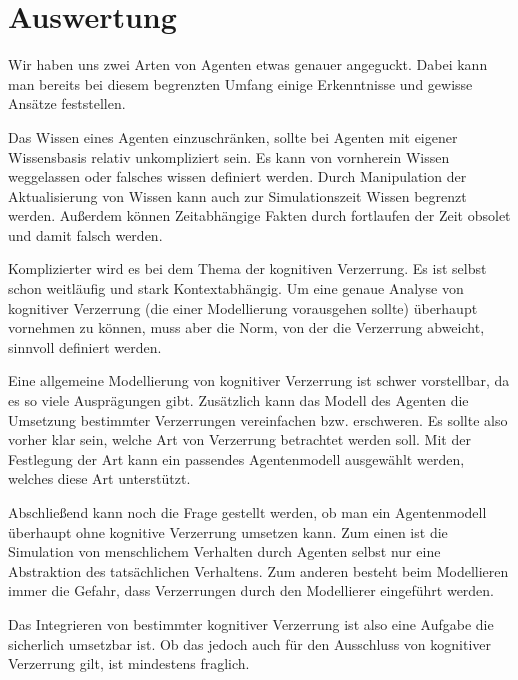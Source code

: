 \chapter{Auswertung}
Wir haben uns zwei Arten von Agenten etwas genauer angeguckt.
Dabei kann man bereits bei diesem begrenzten Umfang einige Erkenntnisse und gewisse Ansätze feststellen.

Das Wissen eines Agenten einzuschränken, sollte bei Agenten mit eigener Wissensbasis relativ unkompliziert sein. 
Es kann von vornherein Wissen weggelassen oder falsches wissen definiert werden.
Durch Manipulation der Aktualisierung von Wissen kann auch zur Simulationszeit Wissen begrenzt werden.
Außerdem können Zeitabhängige Fakten durch fortlaufen der Zeit obsolet und damit falsch werden.

Komplizierter wird es bei dem Thema der kognitiven Verzerrung.
Es ist selbst schon weitläufig und stark Kontextabhängig.
Um eine genaue Analyse von kognitiver Verzerrung (die einer Modellierung vorausgehen sollte) überhaupt vornehmen zu können, muss aber die Norm, von der die Verzerrung abweicht, sinnvoll definiert werden.

Eine allgemeine Modellierung von kognitiver Verzerrung ist schwer vorstellbar, da es so viele Ausprägungen gibt.
Zusätzlich kann das Modell des Agenten die Umsetzung bestimmter Verzerrungen vereinfachen bzw. erschweren.
Es sollte also vorher klar sein, welche Art von Verzerrung betrachtet werden soll.
Mit der Festlegung der Art kann ein passendes Agentenmodell ausgewählt werden, welches diese Art unterstützt.

Abschließend kann noch die Frage gestellt werden, ob man ein Agentenmodell überhaupt ohne kognitive Verzerrung umsetzen kann.
Zum einen ist die Simulation von menschlichem Verhalten durch Agenten selbst nur eine Abstraktion des tatsächlichen Verhaltens.
Zum anderen besteht beim Modellieren immer die Gefahr, dass Verzerrungen durch den Modellierer eingeführt werden.

Das Integrieren von bestimmter kognitiver Verzerrung ist also eine Aufgabe die sicherlich umsetzbar ist.
Ob das jedoch auch für den Ausschluss von kognitiver Verzerrung gilt, ist mindestens fraglich.